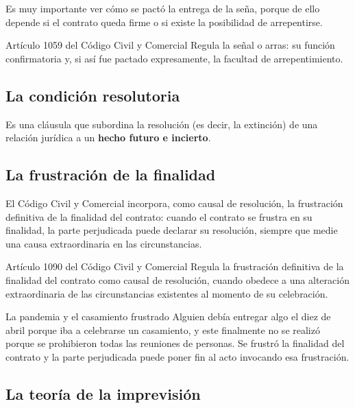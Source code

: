 \documentclass[12pt,oneside]{book}
\begin{document}
\begin{important}
Es muy importante ver cómo se pactó la entrega de la seña, porque de ello depende si el contrato queda firme o si existe la posibilidad de arrepentirse.
\end{important}

\begin{articulo}{Artículo 1059 del Código Civil y Comercial}
Regula la señal o arras: su función confirmatoria y, si así fue pactado expresamente, la facultad de arrepentimiento.
\end{articulo}

\subsection{La condición resolutoria}

Es una cláusula que subordina la resolución (es decir, la extinción) de una relación jurídica a un \textbf{hecho futuro e incierto}.

\subsection{La frustración de la finalidad}

El Código Civil y Comercial incorpora, como causal de resolución, la frustración definitiva de la finalidad del contrato: cuando el contrato se frustra en su finalidad, la parte perjudicada puede declarar su resolución, siempre que medie una causa extraordinaria en las circunstancias.

\begin{articulo}{Artículo 1090 del Código Civil y Comercial}
Regula la frustración definitiva de la finalidad del contrato como causal de resolución, cuando obedece a una alteración extraordinaria de las circunstancias existentes al momento de su celebración.
\end{articulo}

\begin{example}{La pandemia y el casamiento frustrado}
Alguien debía entregar algo el diez de abril porque iba a celebrarse un casamiento, y este finalmente no se realizó porque se prohibieron todas las reuniones de personas. Se frustró la finalidad del contrato y la parte perjudicada puede poner fin al acto invocando esa frustración.
\end{example}

\subsection{La teoría de la imprevisión}
\end{document}
